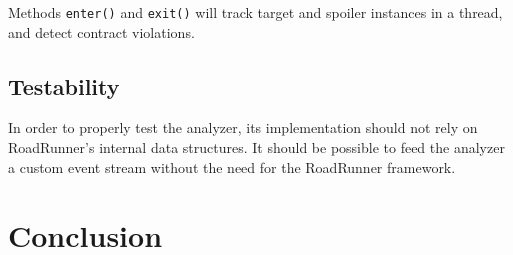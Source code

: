 Methods \texttt{enter()} and \texttt{exit()} will track target and spoiler
instances in a thread, and detect contract violations.


\section{Testability}

In order to properly test the analyzer, its implementation should not rely on
RoadRunner's internal data structures. It should be possible to feed the
analyzer a custom event stream without the need for the RoadRunner framework.



\chapter{Conclusion}

\todo{}

